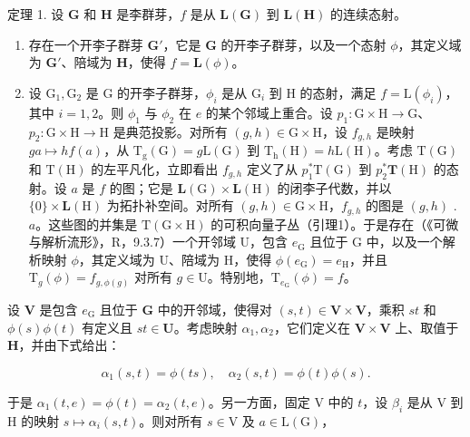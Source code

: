 定理 1. 设 \(\mathbf{G}\) 和 \(\mathbf{H}\) 是李群芽，\(f\) 是从 \(\mathbf{L}(\mathbf{G})\) 到 \(\mathbf{L}(\mathbf{H})\) 的连续态射。

\begin{enumerate}
\def\labelenumi{(\roman{enumi})}
\item
  存在一个开李子群芽 \(\mathbf{G}'\)，它是 \(\mathbf{G}\) 的开李子群芽，以及一个态射 \(\phi\)，其定义域为 \(\mathbf{G}'\)、陪域为 \(\mathbf{H}\)，使得 \(f = \mathbf{L}(\phi)\)。
\item
  设 \(\mathrm{G}_1, \mathrm{G}_2\) 是 G 的开李子群芽，\(\phi_i\) 是从 \(\mathrm{G}_i\) 到 H 的态射，满足 \(f = \mathrm{L}(\phi_i)\)，其中 \(i = 1, 2\)。则 \(\phi_1\) 与 \(\phi_2\) 在 \(e\) 的某个邻域上重合。设 \(p_1: \mathrm{G} \times \mathrm{H} \to \mathrm{G}\)、\(p_2: \mathrm{G} \times \mathrm{H} \to \mathrm{H}\) 是典范投影。对所有 \((g,h) \in \mathrm{G} \times \mathrm{H}\)，设 \(f_{g,h}\) 是映射 \(ga \mapsto hf(a)\)，从 \(\mathrm{T_g(G)} = g\mathrm{L(G)}\) 到 \(\mathrm{T_h(H)} = h\mathrm{L(H)}\)。考虑 \(\mathrm{T(G)}\) 和 \(\mathrm{T(H)}\) 的左平凡化，立即看出 \(f_{g,h}\) 定义了从 \(p_1^*\mathrm{T(G)}\) 到 \(p_{2}^{*}\mathbf{T}(\mathrm{H})\) 的态射。设 \(a\) 是 \(f\) 的图；它是 \(\mathbf{L}(\mathrm{G}) \times \mathbf{L}(\mathrm{H})\) 的闭李子代数，并以 \(\{0\} \times \mathbf{L}(\mathrm{H})\) 为拓扑补空间。对所有 \((g,h) \in \mathrm{G} \times \mathrm{H}\)，\(f_{g,h}\) 的图是 \((g,h)\) . \(a\)。这些图的并集是 \(\mathrm{T}(\mathrm{G} \times \mathrm{H})\) 的可积向量子丛（引理1）。于是存在（《可微与解析流形》，R，9.3.7）一个开邻域 \(\mathrm{U}\)，包含 \(e_{\mathrm{G}}\) 且位于 \(\mathrm{G}\) 中，以及一个解析映射 \(\phi\)，其定义域为 \(\mathrm{U}\)、陪域为 \(\mathrm{H}\)，使得 \(\phi(e_{\mathrm{G}}) = e_{\mathrm{H}}\)，并且 \(\mathrm{T}_{g}(\phi) = f_{g,\phi(g)}\) 对所有 \(g \in \mathrm{U}\)。特别地，\(\mathrm{T}_{e_{\mathrm{G}}}(\phi) = f\)。
\end{enumerate}

设 \(\mathbf{V}\) 是包含 \(e_{\mathrm{G}}\) 且位于 \(\mathbf{G}\) 中的开邻域，使得对 \((s,t)\in \mathbf{V}\times \mathbf{V}\)，乘积 \(st\) 和 \(\phi (s)\phi (t)\) 有定义且 \(st\in \mathbf{U}\)。考虑映射 \(\alpha_{1},\alpha_{2}\)，它们定义在 \(\mathbf{V}\times \mathbf{V}\) 上、取值于 \(\mathbf{H}\)，并由下式给出：

\[
\alpha_ {1} (s, t) = \phi (t s), \quad \alpha_ {2} (s, t) = \phi (t) \phi (s).
\]

于是 \(\alpha_{1}(t,e) = \phi (t) = \alpha_{2}(t,e)\)。另一方面，固定 V 中的 \(t\)，设 \(\beta_{i}\) 是从 V 到 H 的映射 \(s\mapsto \alpha_i(s,t)\)。则对所有 \(s\in \mathrm{V}\) 及 \(a\in \mathrm{L}(\mathrm{G})\)，

